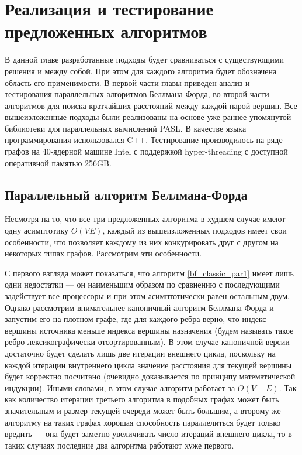 \chapter{Реализация и тестирование предложенных алгоритмов}

В данной главе разработанные подходы будет сравниваться с существующими решения и между собой. При этом для каждого алгоритма будет обозначена область его применимости. В первой части главы приведен анализ и тестирования параллельных алгоритмов Беллмана-Форда, во второй части --- алгоритмов для поиска кратчайших расстояний между каждой парой вершин. Все вышеизложенные подходы были реализованы на основе уже раннее упомянутой библиотеки для параллельных вычислений PASL. В качестве языка программирования использовался C++. Тестирование производилось на ряде графов на 40-ядерной машине Intel с поддержкой hyper-threading \cite{HYPERTHREADING} с доступной оперативной памятью 256GB. 

\FloatBarrier
\section{Параллельный алгоритм Беллмана-Форда}

Несмотря на то, что все три предложенных алгоритма в худшем случае имеют одну асимптотику  $O(VE)$, каждый из вышеизложенных подходов имеет свои особенности, что позволяет каждому из них конкурировать друг с другом на некоторых типах графов. Рассмотрим эти особенности.

С первого взгляда может показаться, что алгоритм \ref{bf_classic_par1} имеет лишь одни недостатки --- он наименьшим образом по сравнению с последующими задействует все процессоры и при этом асимптотически равен остальным двум. Однако рассмотрим внимательнее каноничный алгоритм Беллмана-Форда и запустим его на плотном графе, где для каждого ребра верно, что индекс вершины источника меньше индекса вершины назначения (будем называть такое ребро лексикографически отсортированным). В этом случае каноничной версии достаточно будет сделать лишь две итерации внешнего цикла, поскольку на каждой итерации внутреннего цикла значение расстояния для текущей вершины будет корректно посчитано (очевидно доказывается по принципу математической индукции). Иными словами, в этом случае алгоритм работает за $O(V + E)$. Так как количество итерации третьего алгоритма в подобных графах может быть значительным и размер текущей очереди может быть большим, а второму же алгоритму на таких графах хорошая способность параллелиться будет только вредить --- она будет заметно увеличивать число итераций внешнего цикла, то в таких случаях последние два алгоритма работают хуже первого.   

